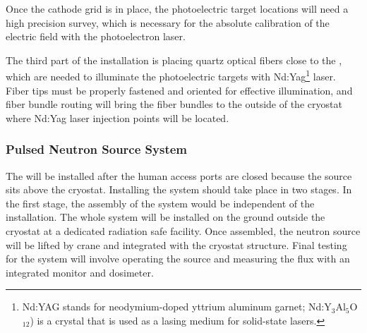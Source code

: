 Once the 
cathode grid is in place, the photoelectric target locations will need a high precision survey, which is necessary for the absolute calibration of the electric field with the photoelectron laser. 

The third part of the installation is placing quartz optical fibers close to the , which are
needed to illuminate the photoelectric targets with Nd:Yag\footnote{Nd:YAG stands for neodymium-doped yttrium aluminum garnet; Nd:Y$_{3}$Al$_{5}$O$_{12}$) is a crystal that is used as a lasing medium for solid-state lasers.} laser. 
Fiber tips must be properly fastened and oriented for effective illumination, and fiber bundle routing will bring the fiber bundles to the outside of the cryostat where Nd:Yag laser injection points will be located. 

\subsubsection{Pulsed Neutron Source System} 
The  will be installed after the human access ports are closed because the source sits above the cryostat. Installing the system should take place in two stages. In the first stage, the assembly of the system would be independent of the  installation. The whole system will be installed on the ground outside the cryostat at a dedicated radiation safe facility. Once assembled, the neutron source will be lifted by crane and integrated with the cryostat structure. Final  testing for the system will involve operating the source and measuring the flux with an integrated monitor and dosimeter.



